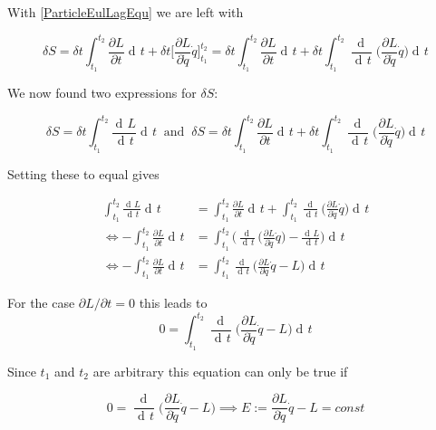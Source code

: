 \documentclass{article}
\DeclareMathOperator{\dd}{d\!}
\begin{document}
With \ref{ParticleEulLagEqu} we are left with

\begin{equation}
\delta S = \delta t \int_{t_1}^{t_2} \frac{\partial L}{\partial t} \dd t
+ \delta t \bigg[ \frac{\partial L}{\partial \dot{q}} \dot{q} \bigg]_{t_1}^{t_2}
= \delta t \int_{t_1}^{t_2} \frac{\partial L}{\partial t} \dd t
+ \delta t \int_{t_1}^{t_2} \frac{\dd}{\dd t} \bigg( \frac{\partial L}{\partial \dot{q}} \dot{q} \bigg) \dd t
\end{equation}

We now found two expressions for $\delta S$:

\begin{equation}
\delta S = \delta t \int_{t_1}^{t_2} \frac{\dd L}{\dd t} \dd t 
\;\; \text{and} \;\;
\delta S = \delta t \int_{t_1}^{t_2} \frac{\partial L}{\partial t} \dd t
+ \delta t \int_{t_1}^{t_2} \frac{\dd}{\dd t} \bigg( \frac{\partial L}{\partial \dot{q}} \dot{q} \bigg) \dd t
\end{equation}

Setting these to equal gives

\begin{align}
\int_{t_1}^{t_2} \frac{\dd L}{\dd t} \dd t
&=  \int_{t_1}^{t_2} \frac{\partial L}{\partial t} \dd t
+ \int_{t_1}^{t_2} \frac{\dd}{\dd t} \bigg( \frac{\partial L}{\partial \dot{q}} \dot{q} \bigg) \dd t \\
\iff
- \int_{t_1}^{t_2} \frac{\partial L}{\partial t} \dd t  
&=  \int_{t_1}^{t_2} \bigg(
\frac{\dd}{\dd t} \bigg( \frac{\partial L}{\partial \dot{q}} \dot{q} \bigg) - \frac{\dd L}{\dd t} \bigg) \dd t \\
\iff
- \int_{t_1}^{t_2} \frac{\partial L}{\partial t} \dd t  
&=  \int_{t_1}^{t_2} \frac{\dd}{\dd t} \bigg(\frac{\partial L}{\partial \dot{q}} \dot{q}  - L \bigg) \dd t
\end{align}


For the case $\partial L / \partial t = 0 $ this leads to
\begin{equation}
0 = \int_{t_1}^{t_2} \frac{\dd}{\dd t} \bigg(\frac{\partial L}{\partial \dot{q}} \dot{q}  - L \bigg) \dd t
\end{equation}

Since $t_1$ and $t_2$ are arbitrary this equation can only be true if

\begin{equation} \label{legendre}
0 = \frac{\dd}{\dd t} \bigg(\frac{\partial L}{\partial \dot{q}} \dot{q}  - L \bigg) 
\implies 
E := \frac{\partial L}{\partial \dot{q}} \dot{q}  - L = const
\end{equation}
\end{document}
